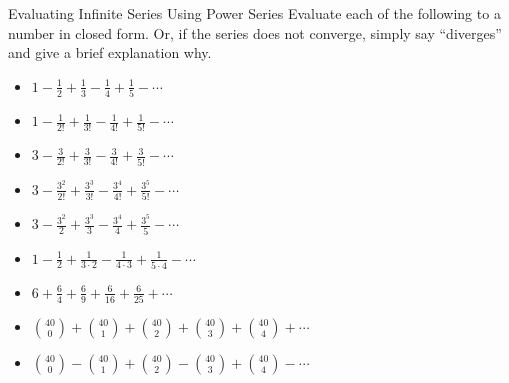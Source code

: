 \begin{exercise}{Evaluating Infinite Series Using Power Series \Coffeecup \Coffeecup \Coffeecup} Evaluate each of the following to a number in closed form.  Or, if the series does not converge, simply say ``diverges'' and give a brief explanation why.

\begin{itemize}
\item $1-\frac{1}{2}+\frac{1}{3}-\frac{1}{4}+\frac{1}{5}-\cdots$

\vspace*{.9in}

\item $1-\frac{1}{2!}+\frac{1}{3!}-\frac{1}{4!}+\frac{1}{5!}-\cdots$
\vspace*{.9in}

\item $3-\frac{3}{2!}+\frac{3}{3!}-\frac{3}{4!}+\frac{3}{5!}-\cdots$
\vspace*{.9in}

\item $3-\frac{3^2}{2!}+\frac{3^3}{3!}-\frac{3^4}{4!}+\frac{3^5}{5!}-\cdots$
\vspace*{.9in}

\item $3-\frac{3^2}{2}+\frac{3^3}{3}-\frac{3^4}{4}+\frac{3^5}{5}-\cdots$
\vspace*{.9in}

\item $1-\frac{1}{2}+\frac{1}{3\cdot 2}-\frac{1}{4\cdot 3}+\frac{1}{5\cdot 4}-\cdots$
\vspace*{.9in}

\item $6+\frac{6}{4}+\frac{6}{9}+\frac{6}{16}+\frac{6}{25}+\cdots$

\vspace*{.9in}

\item $\binom{40}{0}+\binom{40}{1}+\binom{40}{2}+\binom{40}{3}+\binom{40}{4}+\cdots $

\vspace*{.9in}

\item $\binom{40}{0}-\binom{40}{1}+\binom{40}{2}-\binom{40}{3}+\binom{40}{4}-\cdots $

\vspace*{.9in}

\end{itemize}
\end{exercise}

